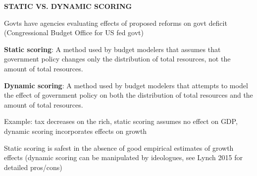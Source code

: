 \documentclass[landscape]{slides}
\begin{document}

\begin{slide}
\begin{center}
{\bf STATIC VS. DYNAMIC SCORING}
\end{center}
Govts have agencies evaluating effects of proposed reforms on govt deficit (Congressional Budget Office for US fed govt)

{\bf Static scoring}:
A method used by budget modelers that assumes that government policy changes only the distribution of total resources, not the amount of total resources.

{\bf Dynamic scoring}:
A method used by budget modelers that attempts to model the effect of government policy on both the distribution of total resources and the amount of total resources.

\small
Example: tax decreases on the rich, static scoring assumes no effect on GDP, dynamic scoring incorporates effects on growth
\normalsize

Static scoring is safest in the absence of good empirical estimates of growth effects (dynamic scoring can be manipulated by ideologues, see Lynch 2015 for detailed pros/cons)

\end{slide}

%
%
%
%
%
\end{document}
